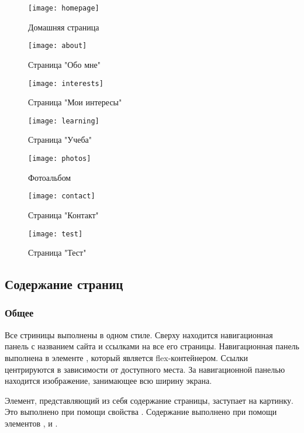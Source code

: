 \documentclass[a4paper,14pt]{extarticle}
\begin{document}
\begin{figure}[H]
    \centering
    \texttt{[image: homepage]}
    \caption{Домашняя страница}
    \label{fig:homepage}
\end{figure}
\begin{figure}[H]
    \centering
    \texttt{[image: about]}
    \caption{Страница "Обо мне"}
    \label{fig:about}
\end{figure}
\begin{figure}[H]
    \centering
    \texttt{[image: interests]}
    \caption{Страница "Мои интересы"}
    \label{fig:interests}
\end{figure}
\begin{figure}[H]
    \centering
    \texttt{[image: learning]}
    \caption{Страница "Учеба"}
    \label{fig:learning}
\end{figure}
\begin{figure}[H]
    \centering
    \texttt{[image: photos]}
    \caption{Фотоальбом}
    \label{fig:photos}
\end{figure}
\begin{figure}[H]
    \centering
    \texttt{[image: contact]}
    \caption{Страница "Контакт"}
    \label{fig:contact}
\end{figure}
\begin{figure}[H]
    \centering
    \texttt{[image: test]}
    \caption{Страница "Тест"}
    \label{fig:test}
\end{figure}

\subsection{Содержание страниц}
\subsubsection{Общее}
Все стриницы выполнены в одном стиле. Сверху находится
навигационная панель с названием сайта и ссылками на
все его страницы. Навигационная панель выполнена в
элементе , который является flex-контейнером.
Ссылки центрируются в зависимости от доступного места.
За навигационной панелью находится изображение, занимающее
всю ширину экрана.

Элемент, представляющий из себя содержание страницы, заступает
на картинку. Это выполнено при помощи свойства .
Содержание выполнено при помощи элементов ,
 и .
\end{document}
